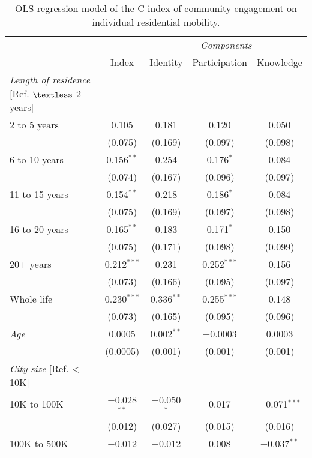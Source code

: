 \documentclass[12pt,a4paper]{article}
\begin{document}
\begin{scriptsize}
\begin{longtable}{@{\extracolsep{5pt}}lcccc}

\caption{OLS regression model of the C index of community engagement on
  individual residential mobility.}\label{tab:residmob}\tabularnewline
\toprule
 &  &  \multicolumn{3}{c}{\it Components}\tabularnewline
\cline{3-5}
& Index & Identity & Participation & Knowledge \tabularnewline
\hline
{\it Length of residence} [Ref. $\textless$ 2 years]\\
 2 to 5 years & 0.105 & 0.181 & 0.120 & 0.050 \\ 
  & (0.075) & (0.169) & (0.097) & (0.098) \\ 
 6 to 10 years & 0.156$^{**}$ & 0.254 & 0.176$^{*}$ & 0.084 \\ 
  & (0.074) & (0.167) & (0.096) & (0.097) \\ 
 11 to 15 years & 0.154$^{**}$ & 0.218 & 0.186$^{*}$ & 0.084 \\ 
  & (0.075) & (0.169) & (0.097) & (0.098) \\ 
 16 to 20 years & 0.165$^{**}$ & 0.183 & 0.171$^{*}$ & 0.150 \\ 
  & (0.075) & (0.171) & (0.098) & (0.099) \\ 
 20+ years & 0.212$^{***}$ & 0.231 & 0.252$^{***}$ & 0.156 \\ 
  & (0.073) & (0.166) & (0.095) & (0.097) \\ 
 Whole life & 0.230$^{***}$ & 0.336$^{**}$ & 0.255$^{***}$ & 0.148 \\ 
  & (0.073) & (0.165) & (0.095) & (0.096) \\ 
  {\it Age} & 0.0005 & 0.002$^{**}$ & $-$0.0003 & 0.0003 \\ 
  & (0.0005) & (0.001) & (0.001) & (0.001) \\ 
{\it City size} [Ref. < 10K]\\
10K to 100K & $-$0.028$^{**}$ & $-$0.050$^{*}$ & 0.017 & $-$0.071$^{***}$ \\ 
  & (0.012) & (0.027) & (0.015) & (0.016) \\ 
100K to 500K & $-$0.012 & $-$0.012 & 0.008 & $-$0.037$^{**}$ \\ 

\end{longtable}
\end{scriptsize}
\end{document}
